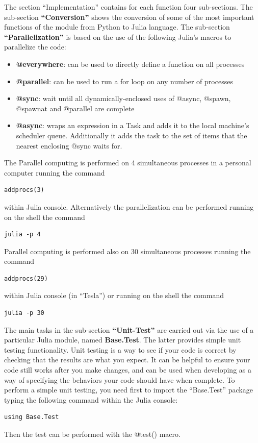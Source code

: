 \documentclass[a4paper,12pt]{article}
\begin{document}
The section ``Implementation'' contains for each function four sub-sections. 
The sub-section \textbf{``Conversion''} shows the conversion of some of the most important functions of the module
from Python to Julia language.
The sub-section \textbf{``Parallelization''} is based on the use of the following Julia's macros to
parallelize the code:
\begin{itemize}

\item \textbf{@everywhere}: can be used to directly define a function on all processes
\item \textbf{@parallel}: can be used to run a for loop on any number of processes
\item \textbf{@sync}: wait until all dynamically-enclosed uses of @async, @spawn, @spawnat and @parallel are complete
\item \textbf{@async}: wraps an expression in a Task and adds it to the local machine's scheduler
queue. Additionally it adds the task to the set of items that the nearest enclosing @sync
waits for.
\end{itemize}
The Parallel computing is performed on 4 simultaneous processes in a personal computer running the command
\begin{Verbatim}[fontsize=\footnotesize]
addprocs(3)
\end{Verbatim}
within Julia console. Alternatively the parallelization can be performed running on the shell the command
\begin{Verbatim}[fontsize=\footnotesize]
julia -p 4
\end{Verbatim}
Parallel computing is performed also on 30 simultaneous processes running the command
\begin{Verbatim}[fontsize=\footnotesize]
addprocs(29)
\end{Verbatim}
within Julia console (in ``Tesla'') or running on the shell the command
\begin{Verbatim}[fontsize=\footnotesize]
julia -p 30
\end{Verbatim}
The main tasks in the sub-section \textbf{``Unit-Test''} are carried out via the use of a particular Julia module, named \textbf{Base.Test}. The latter provides simple unit testing 
functionality. Unit testing is a way to see if your code is correct by checking that the results are what you expect.
It can be helpful to ensure your code still works after you make changes, and can be used when developing as a way of specifying the behaviors your code should have 
when complete.
To perform a simple unit testing, you need first to import the ``Base.Test'' package typing the following command within the Julia console:
\begin{Verbatim}[fontsize=\footnotesize]
using Base.Test
\end{Verbatim}
Then the test can be performed with the @test() macro.
\end{document}
